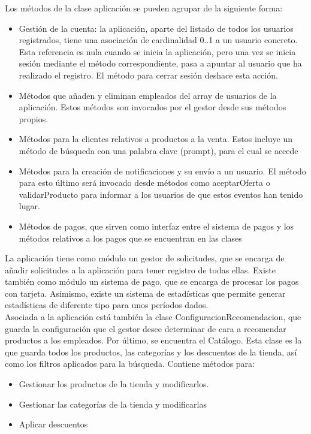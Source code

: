 \documentclass{article}
\begin{document}
Los métodos de la clase aplicación se pueden agrupar de la siguiente forma:
\begin{itemize}
  \item Gestión de la cuenta: la aplicación, aparte del listado de todos los usuarios registrados, tiene una asociación de cardinalidad 0..1 a un usuario concreto. Esta referencia es nula cuando se inicia la aplicación, pero una vez se inicia sesión mediante el método correspondiente, pasa a apuntar al usuario que ha realizado el registro. El método para cerrar sesión deshace esta acción.
  \item Métodos que añaden y eliminan empleados del array de usuarios de la aplicación. Estos métodos son invocados por el gestor desde sus métodos propios.
  \item Métodos para la clientes relativos a productos a la venta. Estos incluye un método de búsqueda con una palabra clave (prompt), para el cual se accede
  \item Métodos para la creación de notificaciones y su envío a un usuario. El método para esto último será invocado desde métodos como aceptarOferta o validarProducto para informar a los usuarios de que estos eventos han tenido lugar.
  \item Métodos de pagos, que sirven como interfaz entre el sistema de pagos y los métodos relativos a los pagos que se encuentran en las clases
\end{itemize}
La aplicación tiene como módulo un gestor de solicitudes, que se encarga de añadir solicitudes a la aplicación para tener registro de todas ellas.
Existe también como módulo un sistema de pago, que se encarga de procesar los pagos con tarjeta.
Asimismo, existe un sistema de estadísticas que permite generar estadísticas de diferente tipo para unos períodos dados. \\
Asociada a la aplicación está también la clase ConfiguracionRecomendacion, que guarda la configuración que el gestor desee determinar de cara a recomendar productos a los empleados.
Por último, se encuentra el Catálogo. Esta clase es la que guarda todos los productos, las categorías y los descuentos de la tienda, así como los filtros aplicados para la búsqueda. Contiene métodos para:
\begin{itemize}
  \item Gestionar los productos de la tienda y modificarlos.
  \item Gestionar las categorías de la tienda y modificarlas
  \item Aplicar descuentos
\end{itemize}
\end{document}
